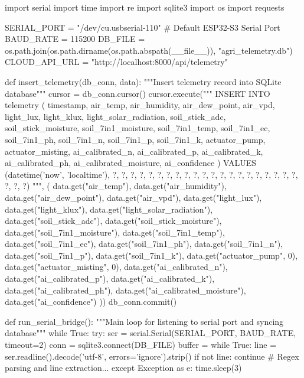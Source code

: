 \begin{pythonbox}
import serial
import time
import re
import sqlite3
import os
import requests

SERIAL_PORT = "/dev/cu.usbserial-110" # Default ESP32-S3 Serial Port
BAUD_RATE = 115200
DB_FILE = os.path.join(os.path.dirname(os.path.abspath(__file__)), "agri_telemetry.db")
CLOUD_API_URL = "http://localhost:8000/api/telemetry"

def insert_telemetry(db_conn, data):
    """Insert telemetry record into SQLite database"""
    cursor = db_conn.cursor()
    cursor.execute("""
        INSERT INTO telemetry (
            timestamp, air_temp, air_humidity, air_dew_point, air_vpd,
            light_lux, light_klux, light_solar_radiation,
            soil_stick_adc, soil_stick_moisture,
            soil_7in1_moisture, soil_7in1_temp, soil_7in1_ec, soil_7in1_ph,
            soil_7in1_n, soil_7in1_p, soil_7in1_k,
            actuator_pump, actuator_misting,
            ai_calibrated_n, ai_calibrated_p, ai_calibrated_k,
            ai_calibrated_ph, ai_calibrated_moisture, ai_confidence
        ) VALUES (datetime('now', 'localtime'), ?, ?, ?, ?, ?, ?, ?, ?, ?, ?, ?, ?, ?, ?, ?, ?, ?, ?, ?, ?, ?, ?, ?, ?)
    """, (
        data.get("air_temp"), data.get("air_humidity"), data.get("air_dew_point"), data.get("air_vpd"),
        data.get("light_lux"), data.get("light_klux"), data.get("light_solar_radiation"),
        data.get("soil_stick_adc"), data.get("soil_stick_moisture"),
        data.get("soil_7in1_moisture"), data.get("soil_7in1_temp"), data.get("soil_7in1_ec"), data.get("soil_7in1_ph"),
        data.get("soil_7in1_n"), data.get("soil_7in1_p"), data.get("soil_7in1_k"),
        data.get("actuator_pump", 0), data.get("actuator_misting", 0),
        data.get("ai_calibrated_n"), data.get("ai_calibrated_p"), data.get("ai_calibrated_k"),
        data.get("ai_calibrated_ph"), data.get("ai_calibrated_moisture"), data.get("ai_confidence")
    ))
    db_conn.commit()

def run_serial_bridge():
    """Main loop for listening to serial port and syncing database"""
    while True:
        try:
            ser = serial.Serial(SERIAL_PORT, BAUD_RATE, timeout=2)
            conn = sqlite3.connect(DB_FILE)
            buffer = {}
            while True:
                line = ser.readline().decode('utf-8', errors='ignore').strip()
                if not line:
                    continue
                # Regex parsing and line extraction...
        except Exception as e:
            time.sleep(3)
\end{pythonbox}

